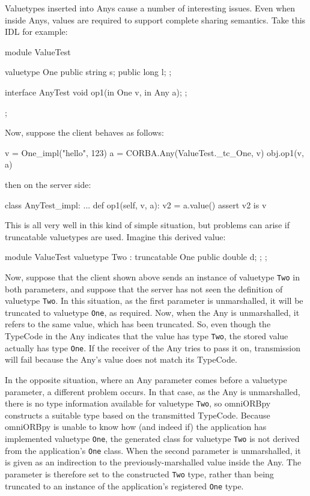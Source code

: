 \documentclass[11pt,oneside,a4paper]{book}
\newcommand{\type}[1]{\texttt{#1}}
\begin{document}
Valuetypes inserted into Anys cause a number of interesting issues.
Even when inside Anys, values are required to support complete sharing
semantics. Take this IDL for example:

\begin{idllisting}
module ValueTest {
  valuetype One {
    public string s;
    public long   l;
  };

  interface AnyTest {
    void op1(in One v, in Any a);
  };
};
\end{idllisting}

\noindent Now, suppose the client behaves as follows:

\begin{pylisting}
v = One_impl("hello", 123)
a = CORBA.Any(ValueTest._tc_One, v)
obj.op1(v, a)
\end{pylisting}

\noindent then on the server side:

\begin{pylisting}
class AnyTest_impl:
    ...
    def op1(self, v, a):
        v2 = a.value()
        assert v2 is v
\end{pylisting}

\noindent
This is all very well in this kind of simple situation, but problems
can arise if truncatable valuetypes are used. Imagine this derived
value:

\begin{idllisting}
module ValueTest {
  valuetype Two : truncatable One {
    public double d;
  };
};
\end{idllisting}

\noindent
Now, suppose that the client shown above sends an instance of
valuetype \type{Two} in both parameters, and suppose that the server
has not seen the definition of valuetype \type{Two}. In this
situation, as the first parameter is unmarshalled, it will be
truncated to valuetype \type{One}, as required. Now, when the Any is
unmarshalled, it refers to the same value, which has been truncated.
So, even though the TypeCode in the Any indicates that the value has
type \type{Two}, the stored value actually has type \type{One}. If the
receiver of the Any tries to pass it on, transmission will fail
because the Any's value does not match its TypeCode.

In the opposite situation, where an Any parameter comes before a
valuetype parameter, a different problem occurs. In that case, as the
Any is unmarshalled, there is no type information available for
valuetype \type{Two}, so omniORBpy constructs a suitable type based on
the transmitted TypeCode. Because omniORBpy is unable to know how (and
indeed if) the application has implemented valuetype \type{One}, the
generated class for valuetype \type{Two} is not derived from the
application's \type{One} class. When the second parameter is
unmarshalled, it is given as an indirection to the
previously-marshalled value inside the Any. The parameter is therefore
set to the constructed \type{Two} type, rather than being truncated to
an instance of the application's registered \type{One} type.
\end{document}
